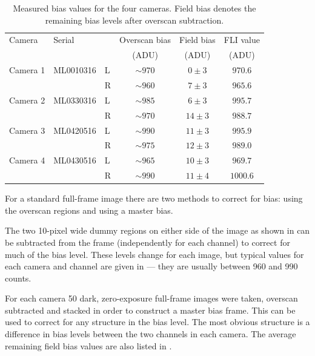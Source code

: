 \begin{colsection}
\begin{colsection}
\begin{table}[t]
    \begin{center}
        \begin{tabular}{l l l | c c | c} %
            Camera   & Serial    &   & Overscan bias & Field bias  & FLI value \\
                     &           &   & (ADU)         & (ADU)       & (ADU)     \\
            \midrule
            Camera 1 & ML0010316 & L & $\sim 970$    & $ 0 \pm 3$  & $970.6$   \\
                     &           & R & $\sim 960$    & $ 7 \pm 3$  & $965.6$   \\
            Camera 2 & ML0330316 & L & $\sim 985$    & $ 6 \pm 3$  & $995.7$   \\
                     &           & R & $\sim 970$    & $14 \pm 3$  & $988.7$   \\
            Camera 3 & ML0420516 & L & $\sim 990$    & $11 \pm 3$  & $995.9$   \\
                     &           & R & $\sim 975$    & $12 \pm 3$  & $989.0$   \\
            Camera 4 & ML0430516 & L & $\sim 965$    & $10 \pm 3$  & $969.7$   \\
                     &           & R & $\sim 990$    & $11 \pm 4$  & $1000.6$  \\
        \end{tabular}
    \end{center}
    \caption[TODO]{
        Measured bias values for the four cameras. Field bias denotes the remaining bias levels after overscan subtraction.
        }\label{tab:bias}
\end{table}

For a standard full-frame image there are two methods to correct for bias: using the overscan regions and using a master bias.

The two 10-pixel wide dummy regions on either side of the image as shown in  can be subtracted from the frame (independently for each channel) to correct for much of the bias level. These levels change for each image, but typical values for each camera and channel are given in  --- they are usually between 960 and 990 counts.

For each camera 50 dark, zero-exposure full-frame images were taken, overscan subtracted and stacked in order to construct a master bias frame. This can be used to correct for any structure in the bias level. The most obvious structure is a difference in bias levels between the two channels in each camera. The average remaining field bias values are also listed in .


\end{colsection}
\end{colsection}
